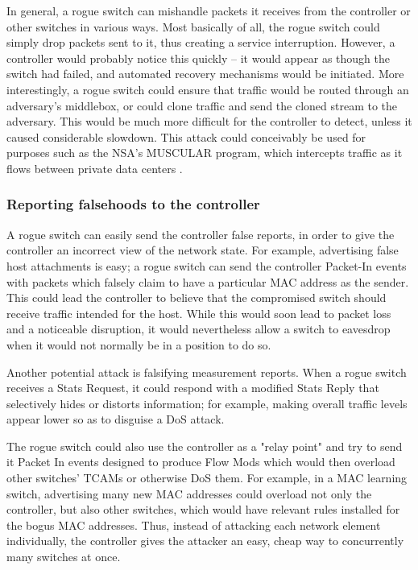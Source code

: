 In general, a rogue switch can mishandle packets it receives from the controller or other switches in various ways. Most basically of all, the rogue switch could simply drop packets sent to it, thus creating a service interruption. However, a controller would probably notice this quickly -- it would appear as though the switch had failed, and automated recovery mechanisms would be initiated. More interestingly, a rogue switch could ensure that traffic would be routed through an adversary's middlebox, or could clone traffic and send the cloned stream to the adversary. This would be much more difficult for the controller to detect, unless it caused considerable slowdown. This attack could conceivably be used for purposes such as the NSA's MUSCULAR program, which intercepts traffic as it flows between private data centers \cite{muscular}. 

\subsubsection{Reporting falsehoods to the controller}

A rogue switch can easily send the controller false reports, in order to give the controller an incorrect view of the network state. For example, advertising false host attachments is easy; a rogue switch can send the controller Packet-In events with packets which falsely claim to have a particular MAC address as the sender. This could lead the controller to believe that the compromised switch should receive traffic intended for the host. While this would soon lead to packet loss and a noticeable disruption, it would nevertheless allow a switch to eavesdrop when it would not normally be in a position to do so.

Another potential attack is falsifying measurement reports. When a rogue switch receives a Stats Request, it could respond with a modified Stats Reply that selectively hides or distorts information; for example, making overall traffic levels appear lower so as to disguise a DoS attack. 

The rogue switch could also use the controller as a "relay point" and try to send it Packet In events designed to produce Flow Mods which would then overload other switches' TCAMs or otherwise DoS them. For example, in a MAC learning switch, advertising many new MAC addresses could overload not only the controller, but also other switches, which would have relevant rules installed for the bogus MAC addresses. Thus, instead of attacking each network element individually, the controller gives the attacker an easy, cheap way to concurrently many switches at once. 


